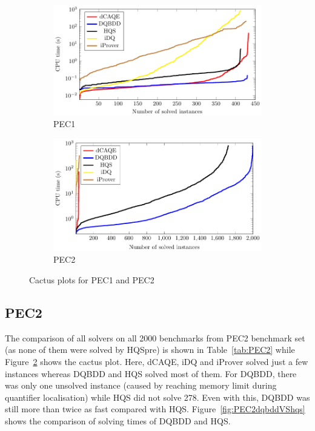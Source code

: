 \documentclass[
  digital, %
  color,
  twoside, %
  table,   %
  nolof,     %
  nolot,     %
]{fithesis3}
\theoremstyle{definition}
\theoremstyle{remark}
\begin{document}
\begin{figure}
  \centering
  \begin{subfigure}{0.98\textwidth}
    \centering
    \includegraphics[width=\textwidth]{figures/PEC1logcactusplot.pdf}
    \caption{PEC1}
    \label{fig:cactusPEC1}
  \end{subfigure}
  \begin{subfigure}{0.98\textwidth}
    \centering
    \includegraphics[width=\textwidth]{figures/PEC2logcactusplot.pdf}
    \caption{PEC2}
    \label{fig:cactusPEC2}
  \end{subfigure}
  \caption{Cactus plots for PEC1 and PEC2}
  \label{fig:cactusPEC12}
\end{figure}

\subsection{PEC2}
The comparison of all solvers on all 2000 benchmarks from PEC2 benchmark set (as none of them were solved by HQSpre) is shown in Table~\ref{tab:PEC2} while Figure~\ref{fig:cactusPEC2} shows the cactus plot. Here, dCAQE, iDQ and iProver solved just a few instances whereas DQBDD and HQS solved most of them. For DQBDD, there was only one unsolved instance (caused by reaching memory limit during quantifier localisation) while HQS did not solve 278. Even with this, DQBDD was still more than twice as fast compared with HQS. Figure~\ref{fig:PEC2dqbddVShqs} shows the comparison of solving times of DQBDD and HQS.
\end{document}

